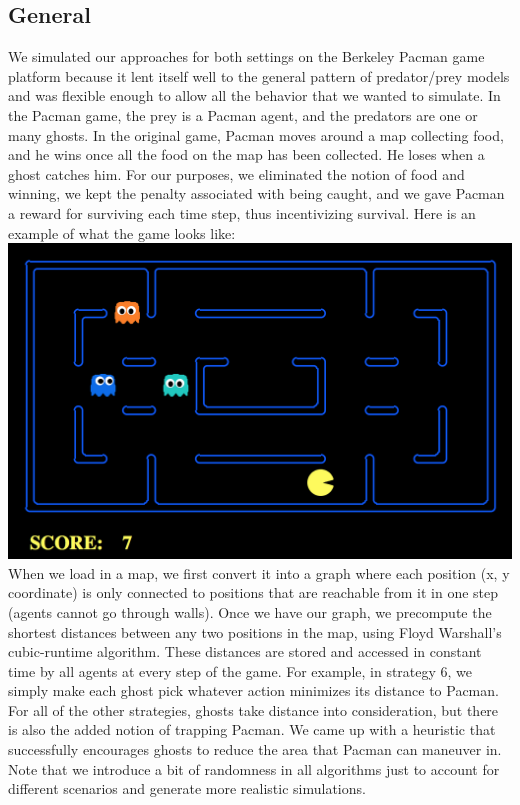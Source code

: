 \documentclass[11pt]{article}
\begin{document}
\begin{multicols}{2}
\subsection{General}
We simulated our approaches for both settings on the Berkeley Pacman game platform because it lent itself well to the general pattern of predator/prey models and was flexible enough to allow all the behavior that we wanted to simulate. In the Pacman game, the prey is a Pacman agent, and the predators are one or many ghosts. In the original game, Pacman moves around a map collecting food, and he wins once all the food on the map has been collected. He loses when a ghost catches him. For our purposes, we eliminated the notion of food and winning, we kept the penalty associated with being caught, and we gave Pacman a reward for surviving each time step, thus incentivizing survival. Here is an example of what the game looks like: \\
\includegraphics[scale=0.4]{examplemap.png}\\
When we load in a map, we first convert it into a graph where each position (x, y coordinate) is only connected to positions that are reachable from it in one step (agents cannot go through walls). Once we have our graph, we precompute the shortest distances between any two positions in the map, using Floyd Warshall's cubic-runtime algorithm. These distances are stored and accessed in constant time by all agents at every step of the game. For example, in strategy 6, we simply make each ghost pick whatever action minimizes its distance to Pacman. For all of the other strategies, ghosts take distance into consideration, but there is also the added notion of trapping Pacman. We came up with a heuristic that successfully encourages ghosts to reduce the area that Pacman can maneuver in. Note that we introduce a bit of randomness in all algorithms just to account for different scenarios and generate more realistic simulations.\\

\end{multicols}
\end{document}
